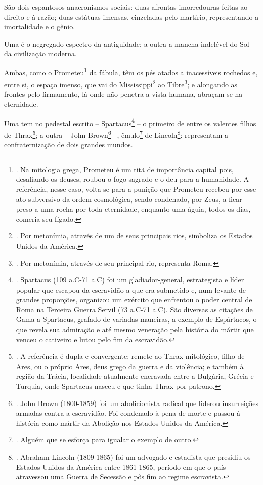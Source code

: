 São dois espantosos anacronismos sociais: duas afrontas imorredouras
feitas ao direito e à razão; duas estátuas imensas, cinzeladas pelo
martírio, representando a imortalidade e o gênio.

Uma é o negregado espectro da antiguidade; a outra a mancha indelével do
Sol da civilização moderna.

Ambas, como o Prometeu\footnote{. Na mitologia grega, Prometeu é um titã
  de importância capital pois, desafiando os deuses, roubou o fogo
  sagrado e o deu para a humanidade. A referência, nesse caso, volta-se
  para a punição que Prometeu recebeu por esse ato subversivo da ordem
  cosmológica, sendo condenado, por Zeus, a ficar preso a uma rocha por
  toda eternidade, enquanto uma águia, todos os dias, comeria seu
  fígado.} da fábula, têm os pés atados a inacessíveis rochedos e, entre
si, o espaço imenso, que vai do Mississippi\footnote{. Por metonímia,
  através de um de seus principais rios, simboliza os Estados Unidos da
  América.} ao Tibre\footnote{. Por metonímia, através de seu principal
  rio, representa Roma.}; e alongando as frontes pelo firmamento, lá
onde não penetra a vista humana, abraçam-se na eternidade.

Uma tem no pedestal escrito -- Spartacus\footnote{. Spartacus (109
  a.C-71 a.C) foi um gladiador-general, estrategista e líder popular que
  escapou da escravidão a que era submetido e, num levante de grandes
  proporções, organizou um exército que enfrentou o poder central de
  Roma na Terceira Guerra Servil (73 a.C-71 a.C). São diversas as
  citações de Gama a Spartacus, grafado de variadas maneiras, a exemplo
  de Espártacos, o que revela sua admiração e até mesmo veneração pela
  história do mártir que venceu o cativeiro e lutou pelo fim da
  escravidão.} -- o primeiro de entre os valentes filhos de
Thrax\footnote{. A referência é dupla e convergente: remete ao Thrax
  mitológico, filho de Ares, ou o próprio Ares, deus grego da guerra e
  da violência; e também à região da Trácia, localidade atualmente
  encravada entre a Bulgária, Grécia e Turquia, onde Spartacus nasceu e
  que tinha Thrax por patrono.}; a outra -- John Brown\footnote{. John
  Brown (1800-1859) foi um abolicionista radical que liderou
  insurreições armadas contra a escravidão. Foi condenado à pena de
  morte e passou à história como mártir da Abolição nos Estados Unidos
  da América.} --, êmulo\footnote{. Alguém que se esforça para igualar o
  exemplo de outro.} de Lincoln\footnote{. Abraham Lincoln (1809-1865)
  foi um advogado e estadista que presidiu os Estados Unidos da América
  entre 1861-1865, período em que o país atravessou uma Guerra de
  Secessão e pôs fim ao regime escravista.}: representam a
confraternização de dois grandes mundos.

